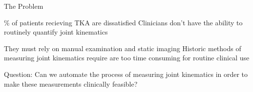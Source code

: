 
\begin{frame}{The Problem}
   \begin{baseitemize}
      \% of patients recieving TKA are dissatisfied
      \itemR Clinicians don't have the ability to routinely quantify joint kinematics
      \begin{baseitemize}
         \itemR They must rely on manual examination and static imaging
         \itemR Historic methods of measuring joint kinematics require are too time consuming for routine clinical use
      \end{baseitemize}
   \end{baseitemize}
   \vfill \pause Question: Can we automate the process of measuring joint kinematics in order to make these measurements clinically feasible?
\end{frame}

